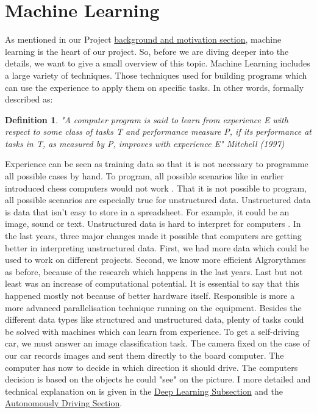 \documentclass[journal]{IEEEtran}
\newtheorem{definition}{Definition}
\begin{document}
\section{Machine Learning}
As mentioned in our Project \hyperref[sec:backgroundMotivation]{background and motivation section}, machine learning is the heart of our project. So, before we are diving deeper into the details, we want to give a small overview of this topic. Machine Learning includes a large variety of techniques. Those techniques used for building programs which can use the experience to apply them on specific tasks. In other words, formally described as: \\
\begin{definition}
\noindent"A computer program is said to learn from experience E with respect to some class of tasks T and performance measure P, if its performance at tasks in T, as measured by P, improves with experience E"\- Mitchell (1997)  \\
\end{definition}
Experience can be seen as training data \cite{wang_2003} so that it is not necessary to programme all possible cases by hand. To program, all possible scenarios like in earlier introduced chess computers would not work \cite{Goodfellow-et-al-2016}. That it is not possible to program, all possible scenarios are especially true for unstructured data. Unstructured data is data that isn't easy to store in a spreadsheet. For example, it could be an image, sound or text. Unstructured data is hard to interpret for computers \cite{Goodfellow-et-al-2016}\cite{LeCun1998}. In the last years, three major changes made it possible that computers are getting better in interpreting unstructured data. First, we had more data which could be used to work on different projects. Second, we know more efficient Algrorythmes as before, because of the research which happens in the last years.
Last but not least was an increase of computational potential. It is essential to say that this happened mostly not because of better hardware itself. Responsible is more a more advanced parallelisation technique running on the equipment. Besides the different data types like structured and unstructured data, plenty of tasks could be solved with machines which can learn from experience. To get a self-driving car, we must answer an image classification task. The camera fixed on the case of our car records images and sent them directly to the board computer. The computer has now to decide in which direction it should drive. The computers decision is based on the objects he could "see" on the picture. I more detailed and technical explanation on is given in the \hyperref[subsec:deeplearning]{Deep Learning Subsection} and the \hyperref[sec:AutonomouslyDriving]{Autonomously Driving Section}.
\end{document}
